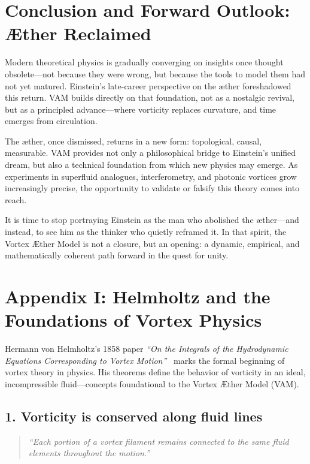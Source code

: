 \documentclass[preprint]{revtex4-2}
\begin{document}
\section*{Conclusion and Forward Outlook: Æther Reclaimed}

Modern theoretical physics is gradually converging on insights once thought obsolete—not because they were wrong, but because the tools to model them had not yet matured. Einstein’s late-career perspective on the æther foreshadowed this return. VAM builds directly on that foundation, not as a nostalgic revival, but as a principled advance—where vorticity replaces curvature, and time emerges from circulation.

The æther, once dismissed, returns in a new form: topological, causal, measurable. VAM provides not only a philosophical bridge to Einstein’s unified dream, but also a technical foundation from which new physics may emerge. As experiments in superfluid analogues, interferometry, and photonic vortices grow increasingly precise, the opportunity to validate or falsify this theory comes into reach.

It is time to stop portraying Einstein as the man who abolished the æther—and instead, to see him as the thinker who quietly reframed it. In that spirit, the Vortex Æther Model is not a closure, but an opening: a dynamic, empirical, and mathematically coherent path forward in the quest for unity.


\appendix
\section*{Appendix I: Helmholtz and the Foundations of Vortex Physics}
\label{appendix:helmholtz}

    Hermann von Helmholtz’s 1858 paper \textit{“On the Integrals of the Hydrodynamic Equations Corresponding to Vortex Motion”}~\cite{helmholtz1858vortices} marks the formal beginning of vortex theory in physics. His theorems define the behavior of vorticity in an ideal, incompressible fluid—concepts foundational to the Vortex Æther Model (VAM).

    \subsection*{1. Vorticity is conserved along fluid lines}
    \begin{quote}
    \textit{“Each portion of a vortex filament remains connected to the same fluid elements throughout the motion.”}
    \end{quote}
\end{document}

